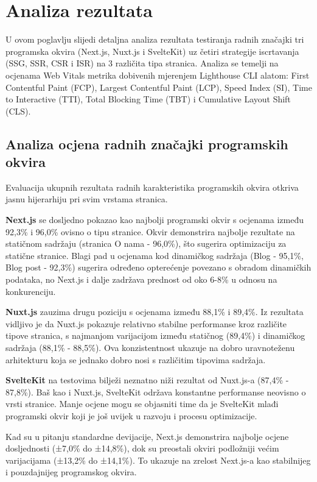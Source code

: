 \section{Analiza rezultata}

U ovom poglavlju slijedi detaljna analiza rezultata testiranja radnih značajki tri programska okvira (Next.js, Nuxt.js i SvelteKit) uz četiri strategije iscrtavanja (SSG, SSR, CSR i ISR) na 3 različita tipa stranica. Analiza se temelji na ocjenama  Web Vitals metrika dobivenih mjerenjem Lighthouse CLI alatom: First Contentful Paint (FCP), Largest Contentful Paint (LCP), Speed Index (SI), Time to Interactive (TTI), Total Blocking Time (TBT) i Cumulative Layout Shift (CLS).

\subsection{Analiza ocjena radnih značajki programskih okvira}

Evaluacija ukupnih rezultata radnih karakteristika programskih okvira otkriva jasnu hijerarhiju pri svim vrstama stranica.

\textbf{Next.js} se dosljedno pokazao kao najbolji programski okvir s ocjenama između 92,3\% i 96,0\% ovisno o tipu stranice. Okvir demonstrira najbolje rezultate na statičnom sadržaju (stranica O nama - 96,0\%), što sugerira optimizaciju za statične stranice. Blagi pad u ocjenama kod dinamičkog sadržaja (Blog - 95,1\%, Blog post - 92,3\%) sugerira određeno opterećenje povezano s obradom dinamičkih podataka, no Next.js i dalje zadržava prednost od oko 6-8\% u odnosu na konkurenciju.

\textbf{Nuxt.js} zauzima drugu poziciju s ocjenama između 88,1\% i 89,4\%. Iz rezultata vidljivo je da Nuxt.js pokazuje relativno stabilne performanse kroz različite tipove stranica, s najmanjom varijacijom između statičnog (89,4\%) i dinamičkog sadržaja (88,1\% - 88,5\%). Ova konzistentnost ukazuje na dobro uravnoteženu arhitekturu koja se jednako dobro nosi s različitim tipovima sadržaja.

\textbf{SvelteKit} na testovima bilježi neznatno niži rezultat od Nuxt.js-a (87,4\% - 87,8\%). Baš kao i Nuxt.js, SvelteKit održava konstantne performanse neovisno o vrsti stranice. Manje ocjene mogu se objasniti time da je SvelteKit mlađi programski okvir koji je još uvijek u razvoju i procesu optimizacije.

Kad su u pitanju standardne devijacije, Next.js demonstrira najbolje ocjene dosljednosti (±7,0\% do ±14,8\%), dok su preostali okviri podložniji većim varijacijama (±13,2\% do ±14,1\%). To ukazuje na zrelost Next.js-a kao stabilnijeg i pouzdajnijeg programskog okvira.

